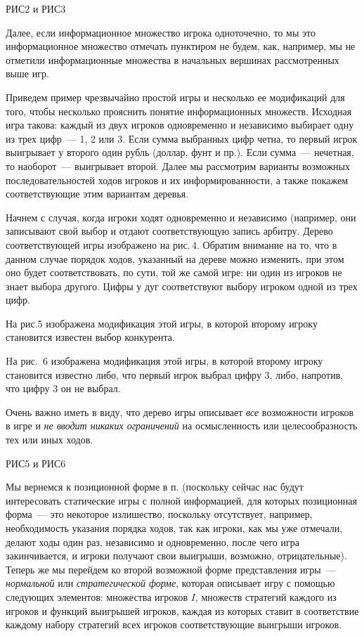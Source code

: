 \documentclass[12pt]{article}
\begin{document}
РИС2 и РИС3



Далее, если информационное множество игрока одноточечно, то мы
это информационное множество отмечать пунктиром не будем, как, например,
мы не отметили информационные множества в начальных вершинах рассмотренных
выше игр.

Приведем пример чрезвычайно простой игры и несколько ее модификаций
для того, чтобы несколько прояснить понятие информационных множеств.
Исходная игра такова: каждый из двух
игроков одновременно и независимо выбирает одну из трех цифр~--- 1, 2 или 3.
Если сумма выбранных цифр четна, то первый игрок выигрывает
у второго один рубль (доллар, фунт и пр.). Если сумма~--- нечетная,
то наоборот~--- выигрывает второй. Далее мы рассмотрим
варианты возможных последовательностей ходов игроков и их информированности,
а также покажем соответствующие этим вариантам деревья.


Начнем с случая, когда игроки ходят одновременно и независимо (например,
они записывают свой выбор и отдают соответствующую запись арбитру.
Дерево соответствующей игры изображено на рис.\,4. Обратим внимание на то, что
в данном случае порядок ходов, указанный на дереве можно изменить, при этом оно
будет соответствовать, по сути, той же самой игре: ни один из игроков не
знает выбора другого. Цифры у дуг соответствуют выбору игроком одной из трех
цифр.

На рис.5 изображена модификация этой игры, в которой второму игроку
становится известен выбор конкурента.

Hа рис.~6 изображена модификация этой игры, в которой второму игроку
становится известно либо, что первый игрок выбрал цифру 3, либо,
напротив, что цифру 3 он не выбрал.

Очень важно иметь в виду, что
дерево игры описывает \emph{все} возможности игроков в игре и \emph{не вводит
никаких ограничений} на осмысленность или целесообразность тех или иных ходов.


РИС5 и РИС6


Мы вернемся к позиционной форме в п.     (поскольку сейчас нас будут
интересовать статические игры с полной информацией, для которых
позиционная форма~--- это некоторое излишество, поскольку отсутствует,
например, необходимость указания порядка ходов, так как игроки, как мы
уже отмечали, делают ходы один раз, независимо и одновременно, после чего
игра закинчивается, и игроки получают свои выигрыши, возможно, отрицательные).
Теперь же мы перейдем ко второй возможной форме представления игры~---
{\it  нормальной} или {\it стратегической форме}, которая описывает игру
с помощью следующих элементов:  множества игроков $I$, множеств стратегий
каждого из игроков и функций выигрышей игроков, каждая из которых ставит
в соответствие каждому набору стратегий всех игроков соответствующие выигрыши
игроков.
\end{document}
